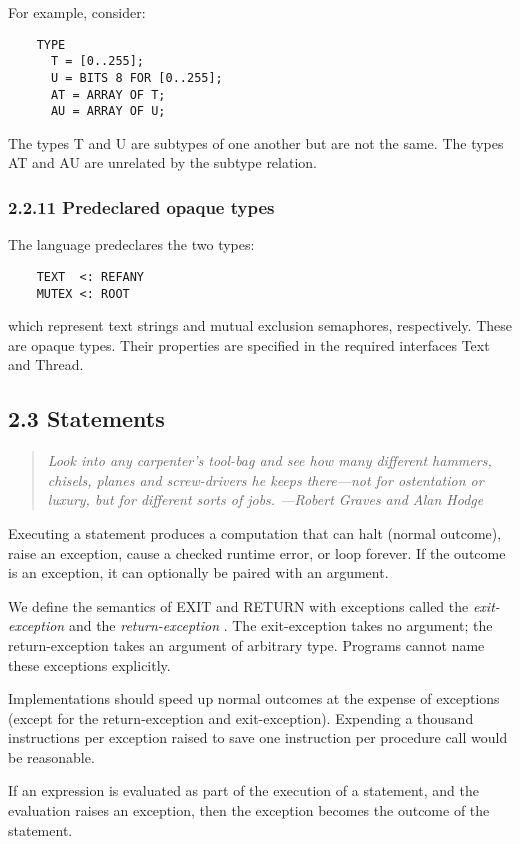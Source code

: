 \documentclass[10pt]{article}
\begin{document}
For example, consider:
\begin{verbatim}
    TYPE
      T = [0..255];
      U = BITS 8 FOR [0..255];
      AT = ARRAY OF T;
      AU = ARRAY OF U;
\end{verbatim}
The types T and U are subtypes of one another but are not the same.  The types
AT and AU are unrelated by the subtype relation.

\subsubsection*{2.2.11 Predeclared opaque types}

The language predeclares the two types:
\begin{verbatim}
    TEXT  <: REFANY
    MUTEX <: ROOT
\end{verbatim}
which represent text strings and mutual exclusion semaphores,
respectively.  These are opaque types.  Their properties are specified in the
required interfaces Text and Thread.

\subsection*{2.3 Statements}

\begin{quote}
  \emph{ Look into any carpenter's tool-bag and see how many different
    hammers, chisels, planes and screw-drivers he keeps there---not for
    ostentation or luxury, but for different sorts of jobs.  ---Robert Graves
    and Alan Hodge }
\end{quote}

Executing a statement produces a computation that can halt (normal outcome),
raise an exception, cause a checked runtime error, or loop forever.  If the
outcome is an exception, it can optionally be paired with an argument.

We define the semantics of EXIT and RETURN with exceptions called the
\emph{exit-exception} and the \emph{return-exception} .  The exit-exception
takes no argument; the return-exception takes an argument of arbitrary
type.  Programs cannot name these exceptions explicitly.

Implementations should speed up normal outcomes at the expense of exceptions
(except for the return-exception and exit-exception).  Expending a thousand
instructions per exception raised to save one instruction per procedure call
would be reasonable.

If an expression is evaluated as part of the execution of a statement, and the
evaluation raises an exception, then the exception becomes the outcome of the
statement.
\end{document}
